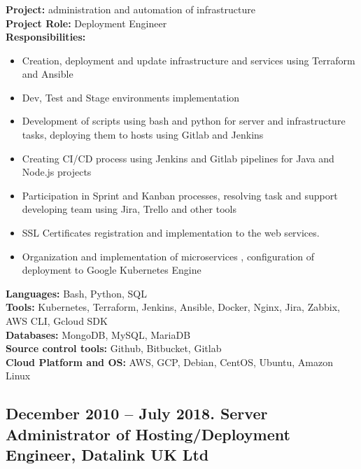 \documentclass[letterpaper]{article}
\begin{document}
\subsubsection{}
\label{sec-2-1-1}
\textbf{Project:} administration and automation of infrastructure\\
\textbf{Project Role:}  Deployment Engineer\\
\textbf{Responsibilities:}\\
\begin{itemize}
\item Creation, deployment and update infrastructure and services using Terraform and Ansible
\item Dev, Test and Stage environments implementation
\item Development of scripts using bash and python for server and infrastructure tasks, deploying them to hosts using Gitlab and Jenkins
\item Creating CI/CD process using Jenkins and Gitlab pipelines for Java and Node.js projects
\item Participation in Sprint and Kanban processes, resolving task and support developing team using Jira, Trello and other tools
\item SSL Certificates registration and implementation to the web services.
\item Organization and implementation of microservices , configuration of deployment to Google Kubernetes Engine
\end{itemize}
\textbf{Languages:} Bash, Python, SQL\\
\textbf{Tools:} Kubernetes, Terraform, Jenkins, Ansible, Docker, Nginx, Jira, Zabbix, AWS CLI, Gcloud SDK \\ 
\textbf{Databases:} MongoDB, MySQL, MariaDB\\
\textbf{Source control tools:} Github, Bitbucket, Gitlab\\
\textbf{Cloud Platform and OS:} AWS, GCP, Debian, CentOS, Ubuntu, Amazon Linux \\
\subsection{{December 2010 – July 2018}. Server Administrator of Hosting/Deployment Engineer, Datalink UK Ltd}
\label{sec-2-1}
\end{document}
